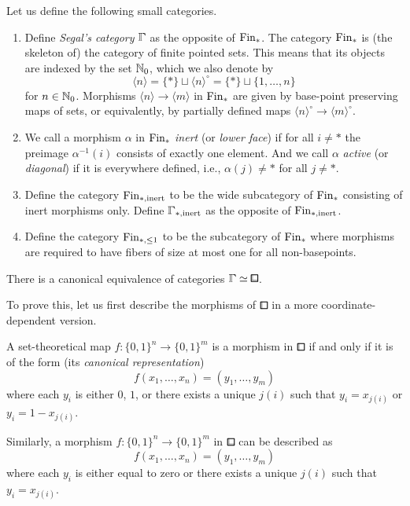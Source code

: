 \begin{definition}\label{def:indexcats}
Let us define the following small categories.
\begin{enumerate}[label=(\roman*), ref=\thedefinition(\roman*)]
    \item\label{def:finstar}
        Define \emph{Segal's category} $\bbGamma$ as the opposite of $\mathrm{Fin}_\ast$.
        The category $\mathrm{Fin}_\ast$ is (the skeleton of) the category of finite pointed sets.
        This means that its objects are indexed by the set ${\mathbb{N}}_0$, which we also denote by
        \[\langle n \rangle=\{\ast\}\sqcup\langle n\rangle^\circ=\{\ast\}\sqcup \{1,\ldots,n\}\]
        for $n\in {\mathbb{N}}_0$.
        Morphisms $\langle n\rangle \to \langle m\rangle$ in $\mathrm{Fin}_*$ are given by base-point preserving maps of sets,
        or equivalently, by partially defined maps $\langle n\rangle^\circ\to \langle m\rangle^\circ$.
    \item\label{def:inert_active}
        We call a morphism $\alpha$ in $\mathrm{Fin}_\ast$ \emph{inert} (or \emph{lower face}) if for all $i\neq\ast$ the preimage $\alpha^{-1}(i)$ consists of exactly one element.
        And we call $\alpha$ \emph{active} (or \emph{diagonal}) if it is everywhere defined, i.e., $\alpha(j)\neq\ast$ for all $j\ne \ast$.
    \item
        Define the category ${\operatorname{Fin}_{\ast,\mathrm{inert}}}$ to be the wide subcategory of $\mathrm{Fin}_*$ consisting of inert morphisms only.
        Define $\inert$ as the opposite of ${\operatorname{Fin}_{\ast,\mathrm{inert}}}$.
    \item\label{def:almost-inert}
        Define the category $\mathrm{Fin}_{*,\le 1}$ to be the subcategory of $\mathrm{Fin}_*$ where morphisms are required to have fibers of size at most one for all non-basepoints.    
\end{enumerate}
\end{definition}


\begin{proposition}\label{lem:iso-gamma-bblox}
There is a canonical equivalence of categories $\bbGamma\simeq{\bblox}$.
\end{proposition}

To prove this, let us first describe the morphisms of $\bbox$ in a more coordinate-dependent version.

\begin{lemma}\label{lem:coordinate_description}
A set-theoretical map $f\colon\{0,1\}^n\to\{0,1\}^m$ is a morphism in $\bbox$
if and only if it is of the form (its \emph{canonical representation})
\[
    f(x_1,\ldots,x_n) = (y_1,\ldots,y_m)
\]
where each $y_i$ is either $0$, $1$, or there exists a unique $j(i)$ such that $y_i = x_{j(i)}$ or $y_i = 1 - x_{j(i)}$.

Similarly, a morphism $f\colon\{0,1\}^n\to\{0,1\}^m$ in $\bblox$ can be described as
\[
    f(x_1,\ldots,x_n) = (y_1,\ldots,y_m)
\]
where each $y_i$ is either equal to zero or there exists a unique $j(i)$ such that $y_i = x_{j(i)}$.
\end{lemma}

